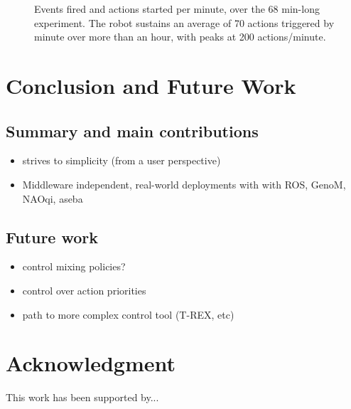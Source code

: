 \documentclass[a4paper, 10pt, conference]{ieeeconf}      %
\begin{document}
\begin{figure}
    \resizebox{\columnwidth}{!}{}
    \caption{Events fired and actions started per minute, over the 68 min-long
    experiment. The robot sustains an average of 70 actions triggered by minute over
    more than an hour, with peaks at 200 actions/minute.}

\end{figure}

\section{Conclusion and Future Work}

\subsection{Summary and main contributions}

\begin{itemize}
    \item strives to simplicity (from a user perspective)
    \item Middleware independent, real-world deployments with with ROS, GenoM, NAOqi, aseba
\end{itemize}

\subsection{Future work}

\begin{itemize}
    \item control mixing policies?
    \item control over action priorities
    \item path to more complex control tool (T-REX, etc)
\end{itemize}

\section*{Acknowledgment}

This work has been supported by...



\end{document}
